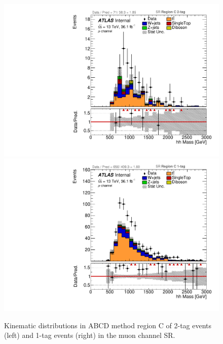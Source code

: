 \begin{figure}[!htbp]
\begin{center}
\includegraphics[scale=0.23]{./figures/boosted/ABCD/muon_SR_RegionC_hhMass}
\includegraphics[scale=0.23]{./figures/boosted/ABCD/muon_SR_RegionC_1tag_hhMass}
\caption{Kinematic distributions in ABCD method region C of 2-tag events (left) and 1-tag events (right) in the muon channel SR.}
\label{fig:boosted_abcd_region_c_SR_muon}
\end{center}
\end{figure}

